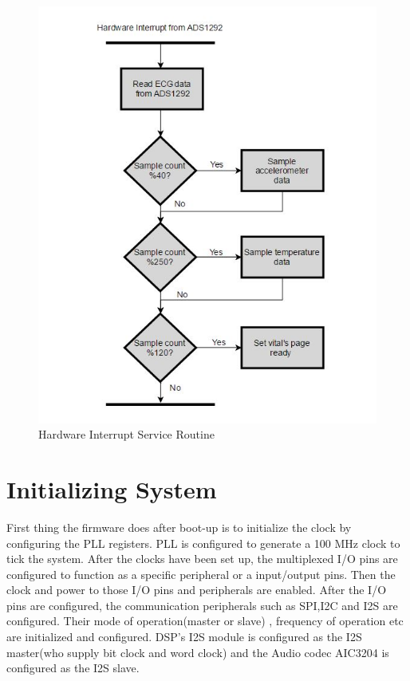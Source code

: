  \begin{figure}[h]
	\centering
	\includegraphics[scale = 1 ]{ECG_interrupt.JPG}
	\caption{Hardware Interrupt Service Routine\label{ecg_isr}}
\end{figure}

\section{Initializing System}
First thing the firmware does after boot-up is to initialize the clock by configuring the PLL registers. PLL is configured to generate a 100 MHz clock to tick the system. After the clocks have been set up, the multiplexed I/O pins are configured to function as a specific peripheral or a input/output pins. Then the clock and power to those I/O pins and peripherals are enabled. After the I/O pins are configured, the communication peripherals such as SPI,I2C and I2S are configured. Their mode of operation(master or slave) , frequency of operation etc are initialized and configured. DSP's I2S module is configured as the I2S master(who supply bit clock and word clock) and the Audio codec AIC3204 is configured as the I2S slave. 

